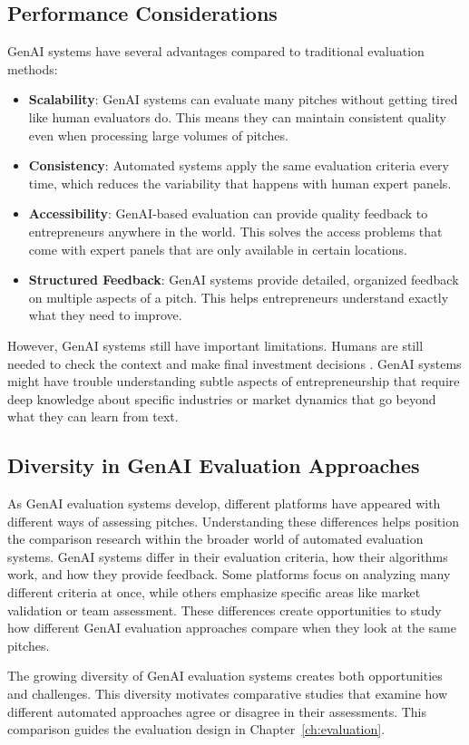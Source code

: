 \subsection{Performance Considerations}\label{subsec:performance-considerations}
GenAI systems have several advantages compared to traditional evaluation methods:

\begin{itemize}
    \item \textbf{Scalability}: GenAI systems can evaluate many pitches without getting tired like human evaluators do. This means they can maintain consistent quality even when processing large volumes of pitches.

    \item \textbf{Consistency}: Automated systems apply the same evaluation criteria every time, which reduces the variability that happens with human expert panels.

    \item \textbf{Accessibility}: GenAI-based evaluation can provide quality feedback to entrepreneurs anywhere in the world. This solves the access problems that come with expert panels that are only available in certain locations.

    \item \textbf{Structured Feedback}: GenAI systems provide detailed, organized feedback on multiple aspects of a pitch. This helps entrepreneurs understand exactly what they need to improve.
\end{itemize}

However, GenAI systems still have important limitations. Humans are still needed to check the context and make final investment decisions \cite{Steyvers2024}. GenAI systems might have trouble understanding subtle aspects of entrepreneurship that require deep knowledge about specific industries or market dynamics that go beyond what they can learn from text.

\subsection{Diversity in GenAI Evaluation Approaches}\label{subsec:GenAI-evaluation-diversity}
As GenAI evaluation systems develop, different platforms have appeared with different ways of assessing pitches. Understanding these differences helps position the comparison research within the broader world of automated evaluation systems. GenAI systems differ in their evaluation criteria, how their algorithms work, and how they provide feedback. Some platforms focus on analyzing many different criteria at once, while others emphasize specific areas like market validation or team assessment. These differences create opportunities to study how different GenAI evaluation approaches compare when they look at the same pitches.

The growing diversity of GenAI evaluation systems creates both opportunities and challenges. This diversity motivates comparative studies that examine how different automated approaches agree or disagree in their assessments. This comparison guides the evaluation design in Chapter~\ref{ch:evaluation}.



